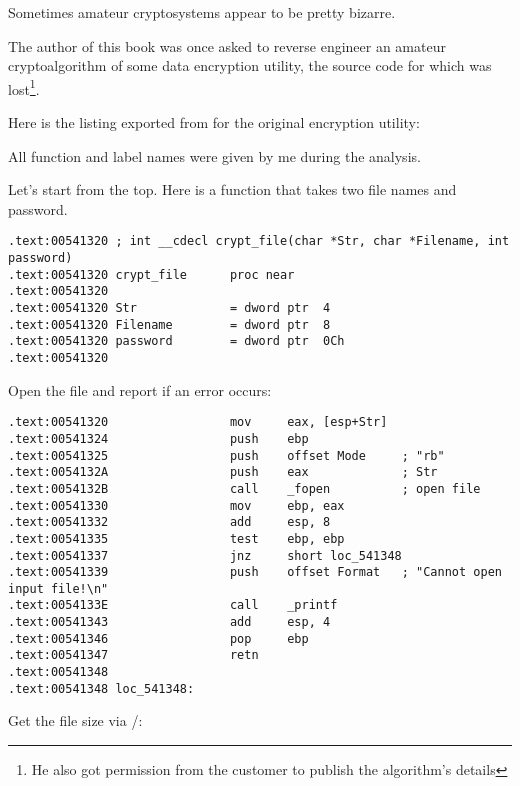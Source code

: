 
Sometimes amateur cryptosystems appear to be pretty bizarre.

The author of this book was once asked to reverse engineer an amateur cryptoalgorithm of some data encryption utility, 
the source code for which was lost\footnote{He also got permission from the customer to publish the algorithm's details}.

Here is the listing exported from \IDA for the original encryption utility:



All function and label names were given by me during the analysis.

Let's start from the top. Here is a function that takes two file names and password.

\begin{lstlisting}[style=customasmx86]
.text:00541320 ; int __cdecl crypt_file(char *Str, char *Filename, int password)
.text:00541320 crypt_file      proc near
.text:00541320
.text:00541320 Str             = dword ptr  4
.text:00541320 Filename        = dword ptr  8
.text:00541320 password        = dword ptr  0Ch
.text:00541320
\end{lstlisting}

Open the file and report if an error occurs:

\begin{lstlisting}[style=customasmx86]
.text:00541320                 mov     eax, [esp+Str]
.text:00541324                 push    ebp
.text:00541325                 push    offset Mode     ; "rb"
.text:0054132A                 push    eax             ; Str
.text:0054132B                 call    _fopen          ; open file
.text:00541330                 mov     ebp, eax
.text:00541332                 add     esp, 8
.text:00541335                 test    ebp, ebp
.text:00541337                 jnz     short loc_541348
.text:00541339                 push    offset Format   ; "Cannot open input file!\n"
.text:0054133E                 call    _printf
.text:00541343                 add     esp, 4
.text:00541346                 pop     ebp
.text:00541347                 retn
.text:00541348
.text:00541348 loc_541348:
\end{lstlisting}

Get the file size via /:

